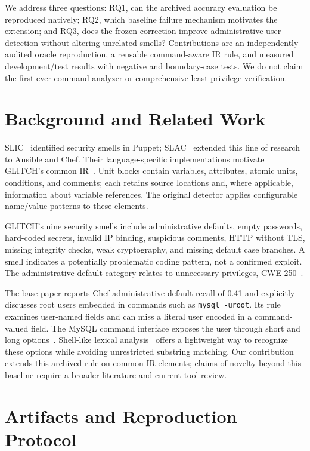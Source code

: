 \documentclass[conference]{IEEEtran}
\begin{document}
We address three questions: RQ1, can the archived accuracy evaluation be reproduced natively; RQ2, which baseline failure mechanism motivates the extension; and RQ3, does the frozen correction improve administrative-user detection without altering unrelated smells? Contributions are an independently audited oracle reproduction, a reusable command-aware IR rule, and measured development/test results with negative and boundary-case tests. We do not claim the first-ever command analyzer or comprehensive least-privilege verification.

\section{Background and Related Work}
SLIC~\cite{slic} identified security smells in Puppet; SLAC~\cite{slac} extended this line of research to Ansible and Chef. Their language-specific implementations motivate GLITCH's common IR~\cite{glitch2022}. Unit blocks contain variables, attributes, atomic units, conditions, and comments; each retains source locations and, where applicable, information about variable references. The original detector applies configurable name/value patterns to these elements.

GLITCH's nine security smells include administrative defaults, empty passwords, hard-coded secrets, invalid IP binding, suspicious comments, HTTP without TLS, missing integrity checks, weak cryptography, and missing default case branches. A smell indicates a potentially problematic coding pattern, not a confirmed exploit. The administrative-default category relates to unnecessary privileges, CWE-250~\cite{cwe250}.

The base paper reports Chef administrative-default recall of 0.41 and explicitly discusses root users embedded in commands such as \texttt{mysql -uroot}. Its rule examines user-named fields and can miss a literal user encoded in a command-valued field. The MySQL command interface exposes the user through short and long options~\cite{mysql}. Shell-like lexical analysis~\cite{shlex} offers a lightweight way to recognize these options while avoiding unrestricted substring matching. Our contribution extends this archived rule on common IR elements; claims of novelty beyond this baseline require a broader literature and current-tool review.

\section{Artifacts and Reproduction Protocol}
\end{document}
